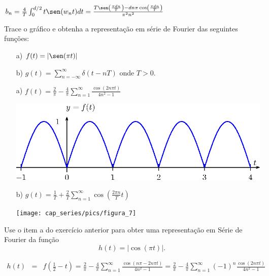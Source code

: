 \begin{resp}
 $
b_n=\frac{4}{T}\int_{0}^{d/2}t\sen(w_nt)dt=\frac{T\sen\left(\frac{\pi d n}{T}\right)-dn\pi\cos\left(\frac{\pi d n}{T}\right)}{\pi^2 n^2}
$
\end{resp}
\begin{exer}{\label{Fourier_8}} Trace o gráfico e obtenha a representação em série de Fourier das seguintes funções:
\begin{itemize}
 \item [a)] $f(t)=|\sen(\pi t)|$
 \item [b)] $g(t)=\sum_{n=-\infty}^\infty \delta(t-nT)$ onde $T>0$.
\end{itemize}
\end{exer}
\begin{resp}
\begin{itemize}
 \item [a)] $f(t)=\frac{2}{\pi}- \frac{4}{\pi}\sum_{n=1}^\infty \frac{\cos(2n\pi t)}{4n^2-1}$
\begin{center}
\includegraphics{cap_series/pics/figura_6}\end{center}
 \item [b)] $g(t)=\frac{1}{T}+ \frac{2}{T} \sum_{n=1}^\infty \cos\left(\frac{2\pi n}{T} t\right)$
\begin{center}
\texttt{[image: cap\_series/pics/figura\_7]}\end{center}
 \end{itemize}
\end{resp}
\begin{exer}{\label{Fourier_9}}
 Use o item a do exercício anterior para obter uma representação em Série de Fourier da função \begin{equation}h(t)=|\cos(\pi t)|.\end{equation}
\end{exer}
\begin{resp}
 \begin{eqnarray*}
h(t)&=&f\left(\frac{1}{2}-t\right)=\frac{2}{\pi}- \frac{4}{\pi}\sum_{n=1}^\infty \frac{\cos\left(n\pi-2n\pi t\right)}{4n^2-1}=\frac{2}{\pi}- \frac{4}{\pi}\sum_{n=1}^\infty(-1)^n \frac{\cos\left(2n\pi t\right)}{4n^2-1}
 \end{eqnarray*}
\end{resp}
